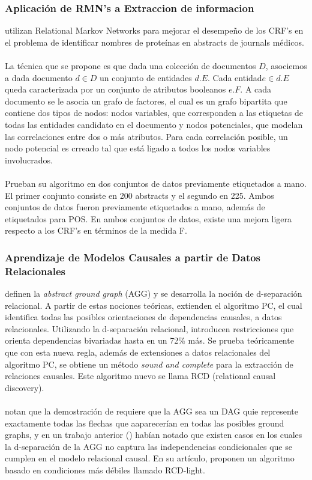 \documentclass[11pt]{article}
\theoremstyle{plain}
\begin{document}
\subsubsection{Aplicación de RMN's a Extraccion de informacion}
\cite{bunescu2007statistical} utilizan Relational Markov Networks para mejorar el desempeño de los CRF's en el problema de identificar nombres de proteínas en abstracts de journals médicos. \\
\\
La técnica que se propone es que dada una colección de documentos $D$, asociemos a dada documento $d \in D$ un conjunto de entidades $d.E$. Cada entidad$e \in d.E$ queda caracterizada por un conjunto de atributos booleanos $e.F$. A cada documento se le asocia un grafo de factores, el cual es un grafo bipartita que contiene dos tipos de nodos: nodos variables, que corresponden a las etiquetas de todas las entidades candidato en el documento y nodos potenciales, que modelan las correlaciones entre dos o más atributos. Para cada correlación posible,  un nodo potencial es crreado tal que está ligado a todos los nodos variables involucrados.\\
\\
Prueban su algoritmo en dos conjuntos de datos previamente etiquetados a mano. El primer conjunto consiste en 200 abstracts y el segundo en 225. Ambos conjuntos de datos fueron previamente etiquetados a mano, además de etiquetados para POS. En ambos conjuntos de datos, existe una mejora ligera respecto a los CRF's en términos de la medida F.

\subsubsection{Aprendizaje de Modelos Causales a partir de Datos Relacionales}
\cite{maier2013reasoning} definen la \textit{abstract ground graph} (AGG) y se desarrolla la noción de d-separación relacional. A partir de estas nociones teóricas, \cite{maier2013sound} extienden el algoritmo PC, el cual identifica todas las posibles orientaciones de dependencias causales, a datos relacionales. Utilizando la d-separación relacional, introducen restricciones que orienta dependencias bivariadas hasta en un 72$\%$ más. Se prueba teóricamente que con esta nueva regla, además de extensiones a datos relacionales del algoritmo PC, se obtiene un método \textit{sound and complete} para la extracción de relaciones causales. Este algoritmo nuevo se llama RCD (relational causal discovery).\\
\\
\cite{lee2016learning} notan que la demostración de \cite{maier2013reasoning} requiere que la AGG sea un DAG quie represente exactamente todas las flechas que aaparecerían en todas las posibles ground graphs, y en un trabajo anterior (\cite{lee2015lifted}) habían notado que existen casos en los cuales la d-separación de la AGG no captura las independencias condicionales que se cumplen en el modelo relacional causal. En su artículo, proponen un algoritmo basado en condiciones más débiles llamado RCD-light.
\end{document}

